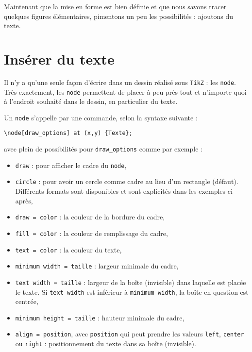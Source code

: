 Maintenant que la mise en forme est bien définie et que nous savons tracer quelques figures élémentaires, pimentons un peu les possibilités : ajoutons du texte.

\section{Insérer du texte}

Il n'y a qu'une seule façon d'écrire dans un dessin réalisé sous \texttt{TikZ} : les \verb?node?. Très exactement, les \verb?node? permettent de placer à peu près tout et n'importe quoi à l'endroit souhaité dans le dessin, en particulier du texte.

Un \verb?node? s'appelle par une commande, selon la syntaxe suivante : \begin{center} \verb?\node[draw_options] at (x,y) {Texte};? \end{center}

\noindent{}avec plein de possibilités pour \verb?draw_options? comme par exemple :

\begin{itemize}[label = ]
\item \verb?draw? : pour afficher le cadre du \verb?node?,

\item \verb?circle? : pour avoir un cercle comme cadre au lieu d'un rectangle (défaut). Différents formats sont disponibles et sont explicités dans les exemples ci-après,

\item \verb?draw = color? : la couleur de la bordure du cadre,

\item \verb?fill = color? : la couleur de remplissage du cadre,

\item \verb?text = color? : la couleur du texte,

\item \verb?minimum width = taille? : largeur minimale du cadre,

\item \verb?text width = taille? : largeur de la boîte (invisible) dans laquelle est placée le texte. Si \verb?text width? est inférieur à \verb?minimum width?, la boîte en question est centrée,

\item \verb?minimum height = taille? : hauteur minimale du cadre,

\item \verb?align = position?, avec \verb?position? qui peut prendre les valeurs \verb?left?, \verb?center? ou \verb?right? : positionnement du texte dans sa boîte (invisible). \\
\end{itemize}

